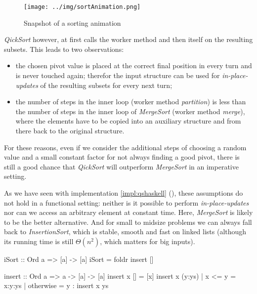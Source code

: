 \begin{figure}[h]
\centering
\texttt{[image: ../img/sortAnimation.png]}
\caption[Sorting in Action]{Snapshot of a sorting animation}
\end{figure}

\emph{QickSort} however, at first calls the worker method and then itself on the resulting subsets.
This leads to two observations:
\begin{itemize}
    \item the chosen pivot value is placed at the correct final position in every turn and is never touched again; therefor the input structure can be used for \emph{in-place-updates} of the resulting subsets for every next turn;
    \item the number of steps in the inner loop (worker method \emph{partition}) is less than the number of steps in the inner loop of \emph{MergeSort} (worker method \emph{merge}), where the elements have to be copied into an auxiliary structure and from there back to the original structure.
\end{itemize}

For these reasons, even if we consider the additional steps of choosing a random value and a small constant factor for not always finding a good pivot, there is still a good chance that \emph{QickSort} will outperform \emph{MergeSort} in an imperative setting.

As we have seen with implementation \ref{impl:qshaskell} (), these assumptions do not hold in a functional setting: neither is it possible to perform \emph{in-place-updates} nor can we access an arbitrary element at constant time.
Here, \emph{MergeSort} is likely to be the better alternative. 
And for small to midsize problems we can always fall back to \emph{InsertionSort}, which is stable, smooth and fast on linked lists (although its running time is still $\Theta (n^2)$, which matters for big inputs).

\begin{impl}
\end{impl}

\begin{haskellcode}
iSort :: Ord a => [a] -> [a]
iSort = foldr insert []

insert :: Ord a => a -> [a] -> [a]
insert x [] = [x]
insert x (y:ys) | x <= y = x:y:ys
                | otherwise = y : insert x ys
\end{haskellcode}

